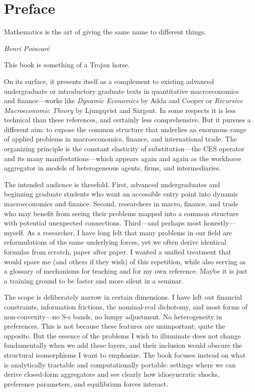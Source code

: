 \chapter*{Preface}

\epigraph{Mathematics is the art of giving the same name to different things.}{\textit{Henri Poincaré}}

\noindent This book is something of a Trojan horse.

On its surface, it presents itself as a complement to existing advanced undergraduate or introductory graduate texts in quantitative macroeconomics and finance---works like \textit{Dynamic Economics} by Adda and Cooper or \textit{Recursive Macroeconomic Theory} by Ljungqvist and Sargent. In some respects it is less technical than these references, and certainly less comprehensive. But it pursues a different aim: to expose the common structure that underlies an enormous range of applied problems in macroeconomics, finance, and international trade. The organizing principle is the constant elasticity of substitution---the CES operator and its many manifestations---which appears again and again as the workhorse aggregator in models of heterogeneous agents, firms, and intermediaries.

The intended audience is threefold. First, advanced undergraduates and beginning graduate students who want an accessible entry point into dynamic macroeconomics and finance. Second, researchers in macro, finance, and trade who may benefit from seeing their problems mapped into a common structure with potential unexpected connections. Third---and perhaps most honestly---myself. As a researcher, I have long felt that many problems in our field are reformulations of the same underlying forces, yet we often derive identical formulas from scratch, paper after paper. I wanted a unified treatment that would spare me (and others if they wish) of this repetition, while also serving as a glossary of mechanisms for teaching and for my own reference. Maybe it is just a training ground to be faster and more silent in a seminar. 

The scope is deliberately narrow in certain dimensions. I have left out financial constraints, information frictions, the nominal-real dichotomy, and most forms of non-convexity---no S-s bands, no lumpy adjustment. No heterogeneity in preferences. This is not because these features are unimportant; quite the opposite. But the essence of the problems I wish to illuminate does not change fundamentally when we add these layers, and their inclusion would obscure the structural isomorphisms I want to emphasize. The book focuses instead on what is analytically tractable and computationally portable: settings where we can derive closed-form aggregators and see clearly how idiosyncratic shocks, preference parameters, and equilibrium forces interact.

